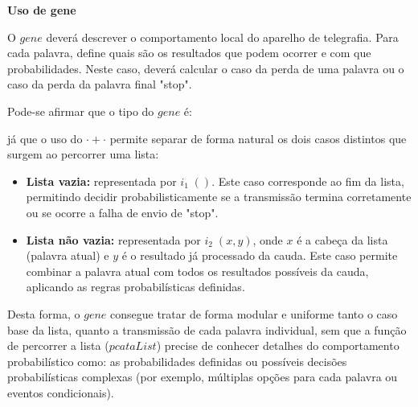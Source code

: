 \documentclass[11pt, a4paper, fleqn]{article}
\newcommand{\Conid}[1]{\mathit{#1}}
\newcommand{\Varid}[1]{\mathit{#1}}
\def\resethooks{%
  \global\let\SaveRestoreHook\empty
  \global\let\ColumnHook\empty}
\let\hspre\empty
\let\hspost\empty
\begin{document}
\textbf{Uso de gene}

O \ensuremath{\Varid{gene}} deverá descrever o comportamento local do aparelho de telegrafia. Para cada palavra, define quais são os resultados que podem ocorrer e com que probabilidades. Neste caso, deverá calcular o caso da perda de uma palavra ou o caso da perda da palavra final "stop".

Pode-se afirmar que o tipo do \ensuremath{\Varid{gene}} é:

\resethooks

já que o uso do \ensuremath{\cdot +\cdot } permite separar de forma natural os dois casos distintos que surgem ao percorrer uma lista:

\begin{itemize}
    \item \textbf{Lista vazia:} representada por \ensuremath{i_1\;()}. Este caso corresponde ao fim da lista, permitindo decidir probabilisticamente se a transmissão termina corretamente ou se ocorre a falha de envio de "stop". 
    \item \textbf{Lista não vazia:} representada por \ensuremath{i_2\;(\Varid{x},\Varid{y})}, onde $x$ é a cabeça da lista (palavra atual) e $y$ é o resultado já processado da cauda. Este caso permite combinar a palavra atual com todos os resultados possíveis da cauda, aplicando as regras probabilísticas definidas.
\end{itemize}

Desta forma, o \ensuremath{\Varid{gene}} consegue tratar de forma modular e uniforme tanto o caso base da lista, quanto a transmissão de cada palavra individual, sem que a função de percorrer a lista (\ensuremath{\Varid{pcataList}}) precise de conhecer detalhes do comportamento probabilístico como: as probabilidades definidas ou possíveis decisões probabilísticas complexas (por exemplo, múltiplas opções para cada palavra ou eventos condicionais).
\end{document}
